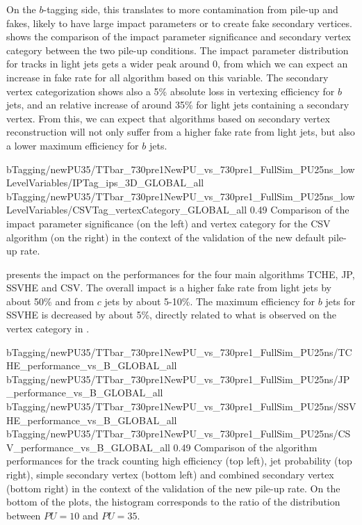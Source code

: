    On the $b$-tagging side, this translates to more contamination from pile-up and
    fakes, likely to have large impact parameters or to create fake secondary vertices.
     shows the comparison of the impact
    parameter significance and secondary vertex category between the two pile-up conditions.
    The impact parameter distribution for tracks in light jets gets a wider peak around
    0, from which we can expect an increase in fake rate for all algorithm based on
    this variable. The secondary vertex categorization shows also a 5\% absolute loss
    in vertexing efficiency for $b$ jets, and an relative increase of around 35\% for light
    jets containing a secondary vertex. From this, we can expect that algorithms based
    on secondary vertex reconstruction will not only suffer from a higher fake rate from 
    light jets, but also a lower maximum efficiency for $b$ jets.

                     {bTagging/newPU35/TTbar_730pre1NewPU_vs_730pre1_FullSim_PU25ns_lowLevelVariables/IPTag_ips_3D_GLOBAL_all}
                     {bTagging/newPU35/TTbar_730pre1NewPU_vs_730pre1_FullSim_PU25ns_lowLevelVariables/CSVTag_vertexCategory_GLOBAL_all}
                     {0.49}
                     {Comparison of the impact parameter significance (on the left)
                     and vertex category for the CSV algorithm (on the right) in the
                     context of the validation of the new default pile-up rate.}

     presents the impact on the performances
    for the four main algorithms TCHE, JP, SSVHE and CSV. The overall impact is a higher
    fake rate from light jets by about 50\% and from $c$ jets by about 5-10\%. The
    maximum efficiency for $b$ jets for SSVHE is decreased by about 5\%, directly
    related to what is observed on the vertex category in .

                      {bTagging/newPU35/TTbar_730pre1NewPU_vs_730pre1_FullSim_PU25ns/TCHE_performance_vs_B_GLOBAL_all}
                      {bTagging/newPU35/TTbar_730pre1NewPU_vs_730pre1_FullSim_PU25ns/JP_performance_vs_B_GLOBAL_all}
                      {bTagging/newPU35/TTbar_730pre1NewPU_vs_730pre1_FullSim_PU25ns/SSVHE_performance_vs_B_GLOBAL_all}
                      {bTagging/newPU35/TTbar_730pre1NewPU_vs_730pre1_FullSim_PU25ns/CSV_performance_vs_B_GLOBAL_all}
                      {0.49}
                      {Comparison of the algorithm performances for the track counting high
                      efficiency (top left), jet probability (top right), simple
                      secondary vertex (bottom left) and combined secondary vertex
                      (bottom right) in the context of the validation of the new pile-up
                      rate. On the bottom of the plots, the histogram corresponds
                      to the ratio of the distribution between $PU = 10$ and $PU = 35$.}

